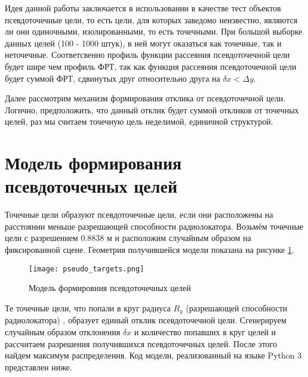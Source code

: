 	Идея данной работы заключается в использовании в качестве тест объектов псевдоточечные цели, то есть цели, для которых заведомо неизвестно, являются ли они одиночными, изолированными, то есть точечными. При большой выборке данных целей (100 - 1000 штук), в ней могут оказаться как точечные, так и неточечные. Соответсвенно профиль функции рассеяния псевдоточечной цели будет шире чем профиль ФРТ, так как функция рассеяния псевдоточечной цели будет суммой ФРТ, сдвинутых друг относительно друга на $ {\delta x < \Delta y} $. 

	Далее рассмотрим механизм формирования отклика от псевдоточечной цели. Логично, предположить, что данный отклик будет суммой откликов от точечных целей, раз мы считаем точечную цель неделимой, единичной структурой.
	
\section{Модель формирования псевдоточечных целей}

	Точечные цели образуют псевдоточечные цели, если они расположены на расстоянии меньше разрешающей способности радиолокатора. Возьмём точечные цели с разрешением 0.8838 м и расположим случайным образом на фиксированной сцене. Геометрия получившейся модели показана на рисунке \ref{fig:pseudo_targets}.
	
	
\begin{figure}[ht]
    \centering
    \texttt{[image: pseudo\_targets.png]}
    \caption{Модель формировния псевдоточечных целей}
    \label{fig:pseudo_targets}
\end{figure}


	Те точечные цели, что попали в круг радиуса  $R_g$  (разрешающей способности радиолокатора) , образует единый отклик псевдоточечной цели. Сгенерируем случайным образом отклонения $ \delta x $ и количество попавших в круг целей и рассчитаем разрешения получившихся псевдоточечных целей. После этого найдем максимум распределения. Код модели, реализованный на языке Python 3 представлен ниже.
	
